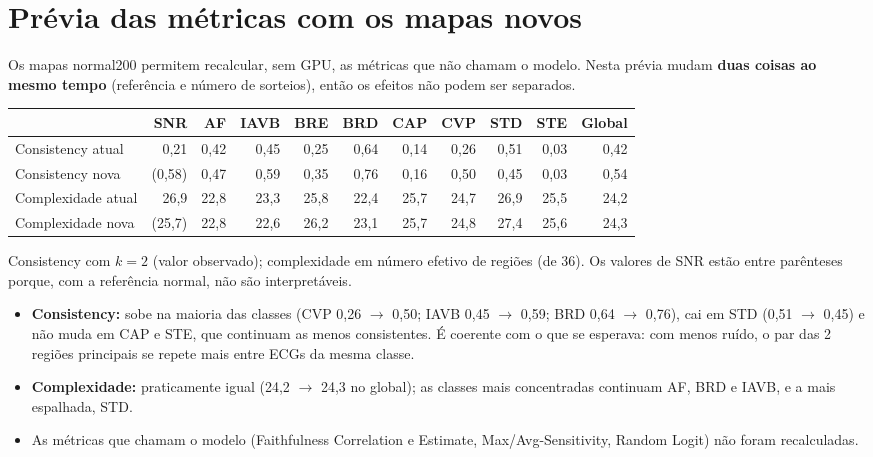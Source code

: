 \documentclass[11pt,a4paper]{article}
\begin{document}
\section{Prévia das métricas com os mapas novos}
Os mapas normal200 permitem recalcular, sem GPU, as métricas que não chamam o modelo. Nesta prévia mudam \textbf{duas coisas ao mesmo tempo} (referência e número de sorteios), então os efeitos não podem ser separados.
\begin{center}\small
\begin{tabular}{lrrrrrrrrrr}
\toprule
& \textbf{SNR} & \textbf{AF} & \textbf{IAVB} & \textbf{BRE} & \textbf{BRD} & \textbf{CAP} & \textbf{CVP} & \textbf{STD} & \textbf{STE} & \textbf{Global} \\
\midrule
Consistency atual & 0,21 & 0,42 & 0,45 & 0,25 & 0,64 & 0,14 & 0,26 & 0,51 & 0,03 & 0,42 \\
Consistency nova & (0,58) & 0,47 & 0,59 & 0,35 & 0,76 & 0,16 & 0,50 & 0,45 & 0,03 & 0,54 \\ \addlinespace
Complexidade atual & 26,9 & 22,8 & 23,3 & 25,8 & 22,4 & 25,7 & 24,7 & 26,9 & 25,5 & 24,2 \\
Complexidade nova & (25,7) & 22,8 & 22,6 & 26,2 & 23,1 & 25,7 & 24,8 & 27,4 & 25,6 & 24,3 \\
\bottomrule
\end{tabular}
\end{center}
Consistency com $k = 2$ (valor observado); complexidade em número efetivo de regiões (de 36). Os valores de SNR estão entre parênteses porque, com a referência normal, não são interpretáveis.
\begin{itemize}
\item \textbf{Consistency:} sobe na maioria das classes (CVP 0,26 $\to$ 0,50; IAVB 0,45 $\to$ 0,59; BRD 0,64 $\to$ 0,76), cai em STD (0,51 $\to$ 0,45) e não muda em CAP e STE, que continuam as menos consistentes. É coerente com o que se esperava: com menos ruído, o par das 2 regiões principais se repete mais entre ECGs da mesma classe.
\item \textbf{Complexidade:} praticamente igual (24,2 $\to$ 24,3 no global); as classes mais concentradas continuam AF, BRD e IAVB, e a mais espalhada, STD.
\item As métricas que chamam o modelo (Faithfulness Correlation e Estimate, Max/Avg-Sensitivity, Random Logit) não foram recalculadas.
\end{itemize}
\end{document}
